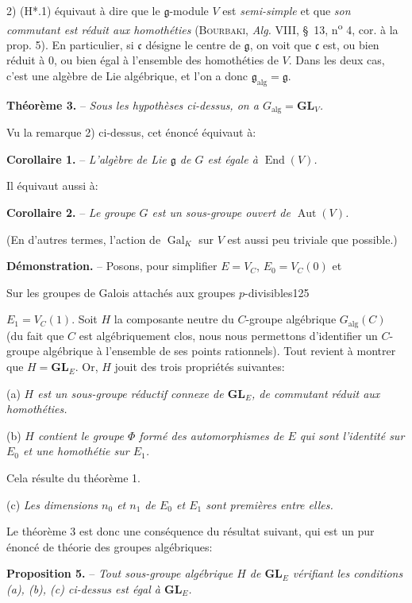 2) (H*.1) équivaut à dire que le $\mathfrak g$-module $V$ est \textit{semi-simple} et que \textit{son commutant est réduit aux homothéties} (\textsc{Bourbaki}, \textit{Alg.} VIII, \S\ 13, n\textsuperscript{o} 4, cor. à la prop. 5). En particulier, si $\mathfrak c$ désigne le centre de $\mathfrak g$, on voit que $\mathfrak c$ est, ou bien réduit à 0, ou bien égal à l'ensemble des homothéties de $V$. Dans les deux cas, c'est une algèbre de Lie algébrique, et l'on a donc $\mathfrak g_{\mathrm{alg}}=\mathfrak g$.

\textbf{Théorème 3.} -- \textit{Sous les hypothèses ci-dessus, on a $G_{\mathrm{alg}}=\mathbf{GL}_V$.}

Vu la remarque 2) ci-dessus, cet énoncé équivaut à:

\textbf{Corollaire 1.} -- \textit{L'algèbre de Lie $\mathfrak g$ de $G$ est égale à $\operatorname{End}(V)$.}

Il équivaut aussi à:

\textbf{Corollaire 2.} -- \textit{Le groupe $G$ est un sous-groupe ouvert de $\operatorname{Aut}(V)$.}

(En d'autres termes, l'action de $\operatorname{Gal}_K$ sur $V$ est aussi peu triviale que possible.)

\textbf{Démonstration.} -- Posons, pour simplifier $E=V_C$, $E_0=V_C(0)$ et

Sur les groupes de Galois attachés aux groupes $p$-divisibles\hfill 125

$E_1=V_C(1)$. Soit $H$ la composante neutre du $C$-groupe algébrique $G_{\mathrm{alg}}(C)$ (du fait que $C$ est algébriquement clos, nous nous permettons d'identifier un $C$-groupe algébrique à l'ensemble de ses points rationnels). Tout revient à montrer que $H=\mathbf{GL}_E$. Or, $H$ jouit des trois propriétés suivantes:

(a) \textit{$H$ est un sous-groupe réductif connexe de $\mathbf{GL}_E$, de commutant réduit aux homothéties.}

(b) \textit{$H$ contient le groupe $\Phi$ formé des automorphismes de $E$ qui sont l'identité sur $E_0$ et une homothétie sur $E_1$.}

Cela résulte du théorème 1.

(c) \textit{Les dimensions $n_0$ et $n_1$ de $E_0$ et $E_1$ sont premières entre elles.}

Le théorème 3 est donc une conséquence du résultat suivant, qui est un pur énoncé de théorie des groupes algébriques:

\textbf{Proposition 5.} -- \textit{Tout sous-groupe algébrique $H$ de $\mathbf{GL}_E$ vérifiant les conditions (a), (b), (c) ci-dessus est égal à $\mathbf{GL}_E$.}

